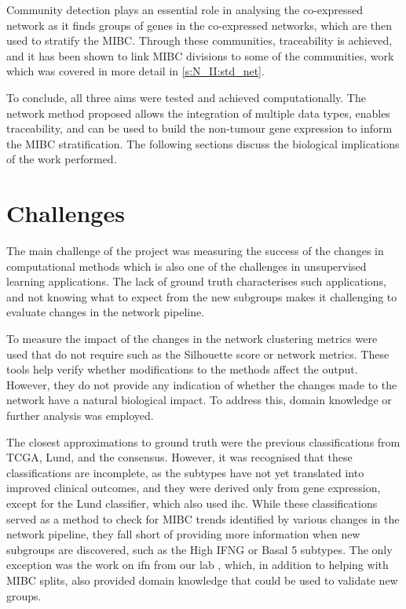 Community detection plays an essential role in analysing the co-expressed network as it finds groups of genes in the co-expressed networks, which are then used to stratify the MIBC. Through these communities, traceability is achieved, and it has been shown to link MIBC divisions to some of the communities, work which was covered in more detail in \cref{s:N_II:std_net}.

% 
To conclude, all three aims were tested and achieved computationally. The network method proposed allows the integration of multiple data types, enables traceability, and can be used to build the non-tumour gene expression to inform the MIBC stratification. The following sections discuss the biological implications of the work performed.

\section{Challenges}

The main challenge of the project was measuring the success of the changes in computational methods which is also one of the challenges in unsupervised learning applications. The lack of ground truth characterises such applications, and not knowing what to expect from the new subgroups makes it challenging to evaluate changes in the network pipeline.

To measure the impact of the changes in the network clustering metrics were used that do not require such as the Silhouette score or network metrics. These tools help verify whether modifications to the methods affect the output. However, they do not provide any indication of whether the changes made to the network have a natural biological impact. To address this, domain knowledge or further analysis was employed.

The closest approximations to ground truth were the previous classifications from TCGA, Lund, and the consensus. However, it was recognised that these classifications are incomplete, as the subtypes have not yet translated into improved clinical outcomes, and they were derived only from gene expression, except for the Lund classifier, which also used \acrlong{ihc}. While these classifications served as a method to check for MIBC trends identified by various changes in the network pipeline, they fall short of providing more information when new subgroups are discovered, such as the High IFNG or Basal 5 subtypes. The only exception was the work on \acrlong{ifn} from our lab \citep{Baker2022-bj}, which, in addition to helping with MIBC splits, also provided domain knowledge that could be used to validate new groups.

